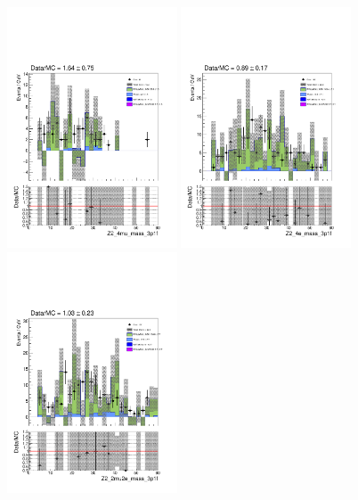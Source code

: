 \begin{figure}[!htb]
\begin{center}
    {\includegraphics [width=0.45\textwidth] {Figures/RedBkg/3P1F/Z2_4mu_mass_3p1f.pdf}}
    {\includegraphics [width=0.45\textwidth] {Figures/RedBkg/3P1F/Z2_4e_mass_3p1f.pdf}} \\
    {\includegraphics [width=0.45\textwidth] {Figures/RedBkg/3P1F/Z2_2mu2e_mass_3p1f.pdf}}

\end{center}
\end{figure}
